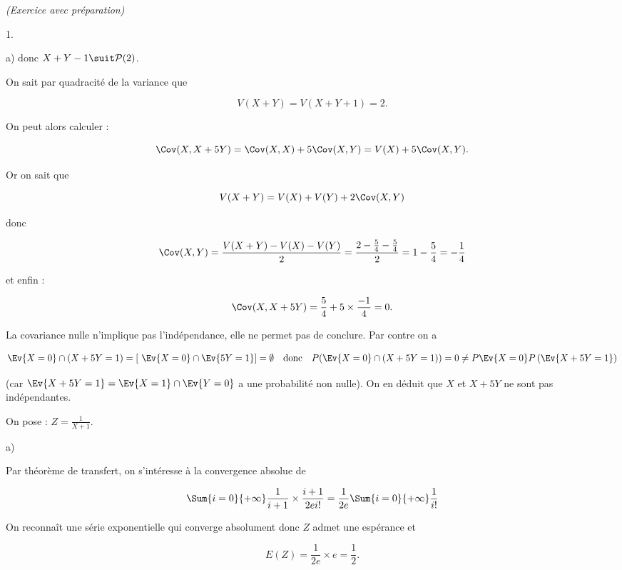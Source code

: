 \documentclass[11pt]{article}%
\begin{document}
\begin{exercice}{\it (Exercice avec préparation)}
\begin{noliste}{1.}
\begin{noliste}{a)}
 donc $ X + Y - 1 \suit \mathcal{P} (2)$. \\

 \item On sait par quadracité de la variance que 
 
\[
 V ( X + Y ) = V ( X + Y + 1 ) = 2. 
\]

 \item On peut alors calculer : 
 
\[
 \Cov ( X, X + 5 Y ) = \Cov ( X, X ) + 5 \Cov ( X, Y ) = V (X ) + 5
\Cov ( X, Y ). 
\]

 Or on sait que
 
\[
 V ( X + Y ) = V ( X ) + V ( Y ) + 2 \Cov ( X, Y ) 
\]

 donc
 
\[
 \Cov ( X, Y ) = \frac{ V ( X + Y ) - V ( X ) - V ( Y ) }{ 2 } = \frac{
2 - \frac{5}{4} - \frac{5}{4} }{ 2 } = 1 - \frac{ 5 }{ 4 } = - \frac{ 1
}{ 4 } 
\]

 et enfin : 
 
\[
 \Cov ( X, X + 5 Y ) = \frac{ 5 }{ 4 } + 5 \times \frac{ -1 }{ 4 } = 0.
\]

 La covariance nulle n'implique pas l'indépendance, elle ne permet pas
de conclure. Par contre on a 
 
\[
 \Ev{X = 0} \cap (X + 5 Y = 1 ) = [ \ \Ev{X = 0} \cap \Ev{ 5Y = 1 } ] =
\emptyset \ \ \text{ donc } \ \ P ( \Ev{X = 0} \cap (X + 5 Y = 1 ) ) =
0 \neq P \Ev{ X = 0 } P \left(\Ev{X + 5 Y = 1}\right) 
\]

 (car $\Ev{X + 5Y = 1} = \Ev{X = 1} \cap \Ev{Y = 0}$ a une probabilité
 non nulle). On en déduit que $X$ et $X + 5Y$ ne sont pas
 indépendantes.

 \end{noliste}

 \item

 On pose : $ Z = \frac{ 1 }{ X + 1 }$. \begin{noliste}{a)}
 \setlength{\itemsep}{2mm}

 \item Par théorème de transfert, on s'intéresse à la convergence
absolue de 
 
\[
 \Sum{i = 0}{+ \infty} \frac{ 1 }{ i + 1 } \times \frac{ i + 1 }{ 2 e
i! } = \frac{ 1 }{ 2e } \Sum{i = 0}{+ \infty} \frac{ 1 }{ i! } 
\]

 On reconnaît une série exponentielle qui converge absolument donc $Z$
admet une espérance et
 
\[
 E ( Z ) = \frac{ 1 }{ 2e } \times e = \frac{ 1 }{ 2 }. 
\]


\end{noliste}
\end{noliste}
\end{exercice}
\end{document}
